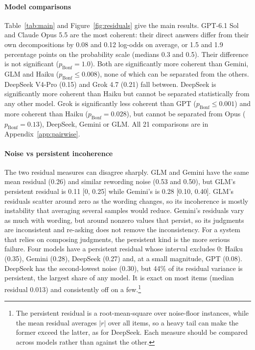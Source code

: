\documentclass[11pt]{article}
\begin{document}
\paragraph{Model comparisons} Table~\ref{tab:main} and Figure~\ref{fig:residuals} give the main results. GPT-6.1 Sol and Claude Opus 5.5 are the most coherent: their direct answers differ from their own decompositions by 0.08 and 0.12 log-odds on average, or 1.5 and 1.9 percentage points on the probability scale (medians 0.3 and 0.5). Their difference is not significant ($p_\text{Bonf}=1.0$). Both are significantly more coherent than Gemini, GLM and Haiku ($p_\text{Bonf}\le 0.008$), none of which can be separated from the others. DeepSeek V4-Pro (0.15) and Grok 4.7 (0.21) fall between. DeepSeek is significantly more coherent than Haiku but cannot be separated statistically from any other model. Grok is significantly less coherent than GPT ($p_\text{Bonf}\le 0.001$) and more coherent than Haiku ($p_\text{Bonf}=0.028$), but cannot be separated from Opus ($p_\text{Bonf}=0.13$), DeepSeek, Gemini or GLM. All 21 comparisons are in Appendix~\ref{app:pairwise}.

\paragraph{Noise vs persistent incoherence} The two residual measures can disagree sharply. GLM and Gemini have the same mean residual (0.26) and similar rewording noise (0.53 and 0.50), but GLM's persistent residual is 0.11 [0, 0.25] while Gemini's is 0.28 [0.10, 0.40]. GLM's residuals scatter around zero as the wording changes, so its incoherence is mostly instability that averaging several samples would reduce. Gemini's residuals vary as much with wording, but around nonzero values that persist, so its judgments are inconsistent and re-asking does not remove the inconsistency. For a system that relies on composing judgments, the persistent kind is the more serious failure. Four models have a persistent residual whose interval excludes 0: Haiku (0.35), Gemini (0.28), DeepSeek (0.27) and, at a small magnitude, GPT (0.08). DeepSeek has the second-lowest noise (0.30), but 44\% of its residual variance is persistent, the largest share of any model. It is exact on most items (median residual 0.013) and consistently off on a few.\footnote{The persistent residual is a root-mean-square over noise-floor instances, while the mean residual averages $|r|$ over all items, so a heavy tail can make the former exceed the latter, as for DeepSeek. Each measure should be compared across models rather than against the other.}
\end{document}
